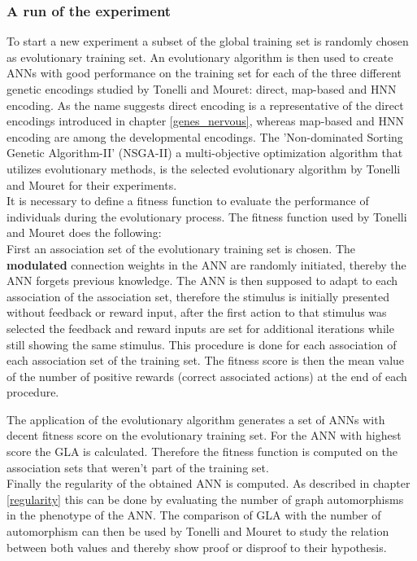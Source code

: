 \documentclass[12pt,twoside]{article}
\theoremstyle{plain}
\theoremstyle{definition}
\theoremstyle{remark}
\begin{document}
\subsubsection*{A run of the experiment}
To start a new experiment a subset of the global training set is randomly chosen as evolutionary training set.
An evolutionary algorithm is then used to create ANNs with good performance on the training set for each of the three different genetic encodings studied by Tonelli and Mouret: direct, map-based and HNN encoding. As the name suggests direct encoding is a representative of the direct encodings introduced in chapter \ref{genes_nervous}, whereas map-based and HNN encoding are among the developmental encodings.
The 'Non-dominated Sorting Genetic Algorithm-II' (NSGA-II) a multi-objective optimization algorithm that utilizes evolutionary methods, is the selected evolutionary algorithm by Tonelli and Mouret for their experiments.\\
It is necessary to define a fitness function to evaluate the performance of individuals during the evolutionary process. The fitness function used by Tonelli and Mouret does the following:\\
First an association set of the evolutionary training set is chosen. The \textbf{modulated} connection weights in the ANN are randomly initiated, thereby the ANN forgets previous knowledge. The ANN is then supposed to adapt to each association of the association set, therefore the stimulus is initially presented without feedback or reward input, after the first action to that stimulus was selected the feedback and reward inputs are set for additional iterations while still showing the same stimulus. This procedure is done for each association of each association set of the training set. The fitness score is then the mean value of the number of positive rewards (correct associated actions) at the end of each procedure.\medskip

The application of the evolutionary algorithm generates a set of ANNs with decent fitness score on the evolutionary training set. For the ANN with highest score the GLA is calculated. Therefore the fitness function is computed on the association sets that weren't part of the training set.\\
Finally the regularity of the obtained ANN is computed. As described in chapter \ref{regularity} this can be done by evaluating the number of graph automorphisms in the phenotype of the ANN. The comparison of GLA with the number of automorphism can then be used by Tonelli and Mouret to study the relation between both values and  thereby show proof or disproof to their hypothesis. \medskip
\end{document}

